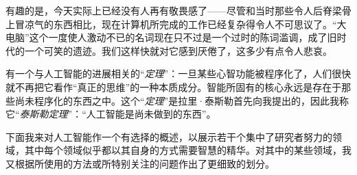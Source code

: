 有趣的是，今天实际上已经没有人再有敬畏感了——尽管和当时那些令人后脊梁骨上冒凉气的东西相比，现在计算机所完成的工作已经复杂得令人不可思议了。“大电脑”这个一度使人激动不已的名词现在只不过是一个过时的陈词滥调，成了旧时代的一个可笑的遗迹。我们这样快就对它感到厌倦了，这多少有点令人悲哀。

有一个与人工智能的进展相关的“\emph{定理}”：一旦某些心智功能被程序化了，人们很快就不再把它看作“真正的思维”的一种本质成分。智能所固有的核心永远是存在于那些尚未程序化的东西之中。这个“\emph{定理}”是拉里·泰斯勒首先向我提出的，因此我称它“\emph{泰斯勒定理}”：“人工智能是尚未做到的东西”。

下面我来对人工智能作一个有选择的概述，以展示若干个集中了研究者努力的领域，其中每个领域似乎都以其自身的方式需要智慧的精华。对其中的某些领域，我又根据所使用的方法或所特别关注的问题作出了更细致的划分。


